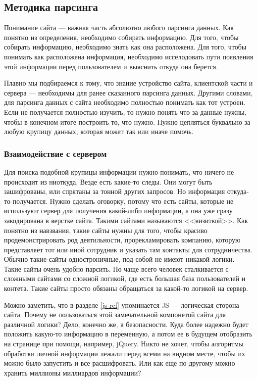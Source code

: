 \subsection{Методика парсинга}
Понимание сайта --- важная часть абсолютно любого парсинга данных. Как понятно из определения, необходимо собирать информацию.
Для того, чтобы собирать информацию, необходимо знать как она расположена.
Для того, чтобы понимать как расположена информация, необходимо исселодовать пути появления этой информации перед пользователем и 
выяснить откуда она берется.

Плавно мы подбираемся к тому, что знание устройство сайта, клиентской части и сервера --- необходимы для ранее сказанного парсинга данных.
Другими словами, для парсинга данных с сайта необходимо полностью понимать как тот устроен. 
Если не получается полностью изучить, то нужно понять что за данные нужны, чтобы в конечном итоге построить то, что нужно.
Нужно цепляться буквально за любую крупицу данных, которая может так или иначе помочь.

\subsubsection{Взаимодействие с сервером}
Для поиска подобной крупицы информации нужно понимать, что ничего не происходит из ниоткуда. Везде есть какие-то следы.
Они могут быть зашифрованы, или спрятаны за тонной других запросов. Но информация откуда-то получается.
Нужно сделать оговорку, потому что есть сайты, которые не используют сервер для получения какой-либо информации, 
а она уже сразу закодирована в верстке сайта. Такими сайтами называются <<визиткой>>.
Как понятно из навзвания, такие сайты нужны для того, чтобы красиво продемонстрировать род деятильности, прорекламировать компанию,
которую представляет тот или иной сотрудник и указать там контакты для сотрудничества.
Обычно такие сайты одностроничные, под собой не имеют никакой логики. Такие сайты очень удобно парсить.
Но чаще всего человек сталкивается с сложными сайтами со сложной логикой, где есть большая база пользователей и контета.
Такие сайты просто обязаны обращаться за какой-то логикой на сервер.

Можно заметить, что в разделе \ref{js-ref} упоминается JS --- логическая сторона сайта. Почему не пользоваться этой замечательной компонетой сайта для различной логики?
Дело, конечно же, в безопасности. Куда более надежно будет положить какую-то информацию в переменную, а потом ее в будущем отобразить на странице при помощи, например, jQuery.
Никто не хочет, чтобы алгоритмы обработки личной информации лежали перед всеми на видном месте, чтобы их можно было запустить и все расшифровать.
Или как еще по-другому можно хранить миллионы миллиардов информации?

